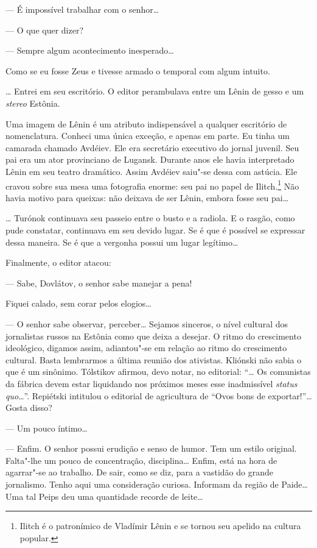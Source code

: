 --- É impossível trabalhar com o senhor\ldots{}

--- O que quer dizer?

--- Sempre algum acontecimento inesperado\ldots{}

Como se eu fosse Zeus e tivesse armado o temporal com algum intuito.

\ldots{} Entrei em seu escritório. O editor perambulava entre um Lênin de
gesso e um \emph{stereo} Estônia.

Uma imagem de Lênin é um atributo indispensável a qualquer escritório de
nomenclatura. Conheci uma única exceção, e apenas em parte. Eu tinha um
camarada chamado Avdéiev. Ele era secretário executivo do jornal
juvenil. Seu pai era um ator provinciano de Lugansk. Durante anos ele
havia interpretado Lênin em seu teatro dramático. Assim Avdéiev saiu"-se
dessa com astúcia. Ele cravou sobre sua mesa uma fotografia enorme: seu
pai no papel de Ilitch.\footnote{Ilitch é o patronímico de Vladímir
  Lênin e se tornou seu apelido na cultura popular.} Não havia motivo
para queixas: não deixava de ser Lênin, embora fosse seu pai\ldots{}

\ldots{} Turónok continuava seu passeio entre o busto e a radiola. E o
rasgão, como pude constatar, continuava em seu devido lugar. Se é que é
possível se expressar dessa maneira. Se é que a vergonha possui um lugar
legítimo\ldots{}

Finalmente, o editor atacou:

--- Sabe, Dovlátov, o senhor sabe manejar a pena!

Fiquei calado, sem corar pelos elogios\ldots{}

--- O senhor sabe observar, perceber\ldots{} Sejamos sinceros, o nível
cultural dos jornalistas russos na Estônia como que deixa a desejar. O
ritmo do crescimento ideológico, digamos assim, adiantou"-se em relação
ao ritmo do crescimento cultural. Basta lembrarmos a última reunião dos
ativistas. Kliónski não sabia o que é um sinônimo. Tólstikov afirmou,
devo notar, no editorial: ``\ldots{} Os comunistas da fábrica devem estar
liquidando nos próximos meses esse inadmissível \emph{status quo}\ldots{}''.
Repiétski intitulou o editorial de agricultura de ``Ovos bons de
exportar!''\ldots{} Gosta disso?

--- Um pouco íntimo\ldots{}

--- Enfim. O senhor possui erudição e senso de humor. Tem um
estilo original. Falta"-lhe um pouco de concentração, disciplina\ldots{}
Enfim, está na hora de agarrar"-se ao trabalho. De sair, como se diz,
para a vastidão do grande jornalismo. Tenho aqui uma consideração
curiosa. Informam da região de Paide\ldots{} Uma tal Peips deu uma quantidade
recorde de leite\ldots{}

